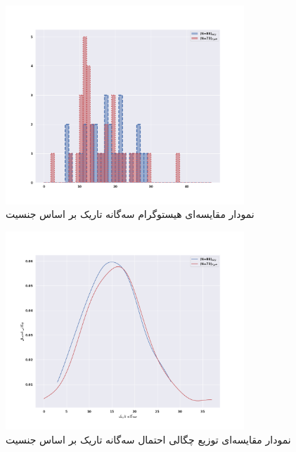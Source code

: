 \begin{figure}[htpb]
    \centering
    \includegraphics[width=0.8\textwidth]{./img/BoxPlotDTRSVOType.png}
    \caption{نمودار مقایسه‌ای هیستوگرام سه‌گانه تاریک بر اساس جنسیت}
    \label{fig:BoxPlotDTRSVOType}
\end{figure}
\begin{figure}[htpb]
    \centering
    \includegraphics[width=0.8\textwidth]{./img/PDFGramDTRSex.png}
    \caption{نمودار مقایسه‌ای توزیع چگالی احتمال سه‌گانه تاریک بر اساس جنسیت}
    \label{fig:PDFGramDTRSex}
\end{figure}




